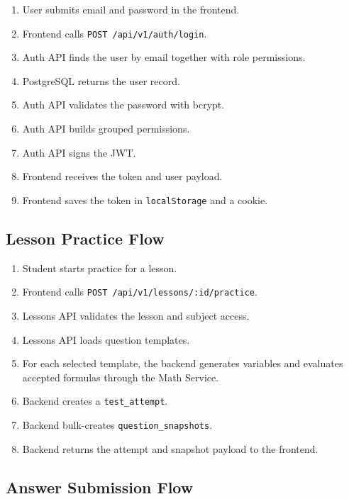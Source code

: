 \documentclass[11pt,a4paper]{article}
\newcommand{\docpath}[1]{\texttt{#1}}
\begin{document}
\begin{enumerate}[leftmargin=1.5em]
  \item User submits email and password in the frontend.
  \item Frontend calls \docpath{POST /api/v1/auth/login}.
  \item Auth API finds the user by email together with role permissions.
  \item PostgreSQL returns the user record.
  \item Auth API validates the password with bcrypt.
  \item Auth API builds grouped permissions.
  \item Auth API signs the JWT.
  \item Frontend receives the token and user payload.
  \item Frontend saves the token in \docpath{localStorage} and a cookie.
\end{enumerate}

\subsection{Lesson Practice Flow}

\begin{enumerate}[leftmargin=1.5em]
  \item Student starts practice for a lesson.
  \item Frontend calls \docpath{POST /api/v1/lessons/:id/practice}.
  \item Lessons API validates the lesson and subject access.
  \item Lessons API loads question templates.
  \item For each selected template, the backend generates variables and evaluates accepted formulas through the Math Service.
  \item Backend creates a \docpath{test\_attempt}.
  \item Backend bulk-creates \docpath{question\_snapshots}.
  \item Backend returns the attempt and snapshot payload to the frontend.
\end{enumerate}

\subsection{Answer Submission Flow}
\end{document}
